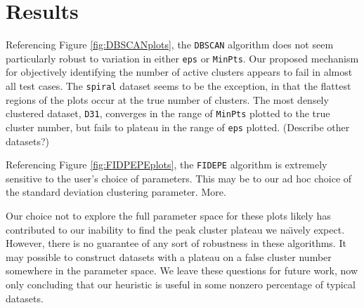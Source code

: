 \documentclass[12pt]{article}
\begin{document}
\section{Results}
\par Referencing Figure \ref{fig:DBSCANplots}, the \texttt{DBSCAN} algorithm does not seem particularly robust to variation in either \texttt{eps} or \texttt{MinPts}. Our proposed mechanism for objectively identifying the number of active clusters appears to fail in almost all test cases. The \texttt{spiral} dataset seems to be the exception, in that the flattest regions of the plots occur at the true number of clusters. The most densely clustered dataset, \texttt{D31}, converges in the range of \texttt{MinPts} plotted to the true cluster number, but fails to plateau in the range of \texttt{eps} plotted. (Describe other datasets?)
\par Referencing Figure \ref{fig:FIDPEPEplots}, the \texttt{FIDEPE} algorithm is extremely sensitive to the user's choice of parameters. This may be to our ad hoc choice of the standard deviation clustering parameter. More.

\par Our choice not to explore the full parameter space for these plots likely has contributed to our inability to find the peak cluster plateau we na\"\i vely expect. However, there is no guarantee of any sort of robustness in these algorithms. It may possible to construct datasets with a plateau on a false cluster number somewhere in the parameter space. We leave these questions for future work, now only concluding that our heuristic is useful in some nonzero percentage of typical datasets.
\clearpage


\end{document}
